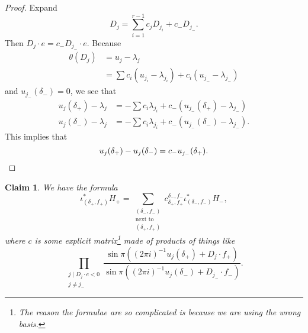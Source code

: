 \documentclass[leqno, openany]{memoir}
\newtheorem{claim}[thm]{Claim}
\theoremstyle{definition}
\theoremstyle{remark}
\theoremstyle{plain}
\theoremstyle{definition}
\theoremstyle{remark}
\begin{document}
\begin{proof}
    Expand
    \[ D_j = \sum_{i=1}^{r-1} c_j D_{j_i} + c_- D_{j_-}. \]
    Then $D_j \cdot e = c_- D_{j_-} \cdot e$. Because
    \begin{align*}
        \theta(D_j) &= u_j - \lambda_j \\
        &= \sum c_i(u_{j_i} - \lambda_{j_i}) + c_i (u_{j_-} - \lambda_{j_-})
    \end{align*}
    and $u_{j_-}(\delta_-) = 0$, we see that
    \begin{align*}
        u_j(\delta_+) - \lambda_j &= -\sum c_i \lambda_{j_i} + c_-(u_{j_-}(\delta_+) - \lambda_{j_-}) \\
        u_j(\delta_-) - \lambda_j &= -\sum c_i \lambda_{j_i} + c_-(u_{j_-}(\delta_-) - \lambda_{j_-}).
    \end{align*}
    This implies that
    \[ u_j(\delta_+) - u_j(\delta_-) = c_- u_{j_-}(\delta_+). \qedhere \]
\end{proof}

\begin{claim}
    We have the formula
    \[ \iota^*_{(\delta_+, f_+)} H_+ = \sum_{\substack{(\delta_-, f_-) \\ \text{next to}\\(\delta_+, f_+)}} c_{\delta_+, f_+}^{\delta_-, f_-} \iota_{(\delta_-, f_-)}^* H_-, \]
    where $c$ is some explicit matrix\footnote{The reason the formulae are so complicated is because we are using the wrong basis.} made of products of things like
    \[ \prod_{\substack{j \mid D_j \cdot e < 0 \\ j \neq j_-}} \frac{\sin \pi ( (2\pi i)^{-1} u_j(\delta_+) + D_j \cdot f_+ )}{\sin \pi ((2\pi i)^{-1}u_j(\delta_-) + D_{j_-} \cdot f_-)}. \]
\end{claim}
\end{document}
